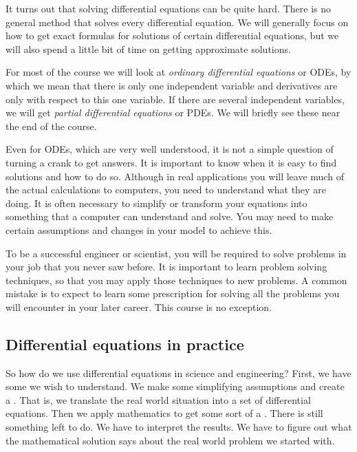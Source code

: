 \documentclass[12pt]{book}
\begin{document}
\medskip

It turns out that solving differential equations can be quite hard.  
There is no general method that solves every differential equation.  We will
generally focus on how to get exact formulas for solutions of certain
differential
equations, but we will also spend a little bit of time
on getting approximate solutions.

For most of the course we will look at
\emph{ordinary differential equations} or ODEs, by which we mean that there
is only one independent variable and derivatives are only with respect to
this one variable.
If there are several independent variables, we will get
\emph{partial differential equations}
or PDEs.
We will briefly see these near the
end of the course.

Even for ODEs, which are very well understood, it is not a simple question
of turning a crank to get answers.  
It is important to
know when it is easy to find solutions and how to do so.
Although in real applications you will
leave much of the actual calculations to computers, you
need to understand what they are doing.  It is often necessary
to simplify or transform your equations into something that a computer can
understand and solve.
You may need to make certain assumptions and changes in your
model to achieve this.

To be a successful engineer or scientist, you will be required to solve
problems in your job that you never saw before.  It is important to
learn problem solving techniques, so that you may apply those techniques to
new problems.  A common mistake is to expect to learn some prescription for
solving all the problems you will encounter in your later career.  This
course is no exception.


\subsection{Differential equations in practice}

\begin{diffyfloatingfigurer}{3.05in}{3.35in}
\noindent
{}
\end{diffyfloatingfigurer}
So how do we use differential equations in science and engineering?  
First, we have some \emph{} we wish
to understand.
We make some simplifying assumptions and create a \emph{}.
That is, we translate the real world situation into a
set of differential equations.
Then we apply mathematics to get some sort of a \emph{}.
There is still something left to do.  We have to interpret the results.
We have to figure out what the mathematical solution says about the real world
problem we started with.
\end{document}
